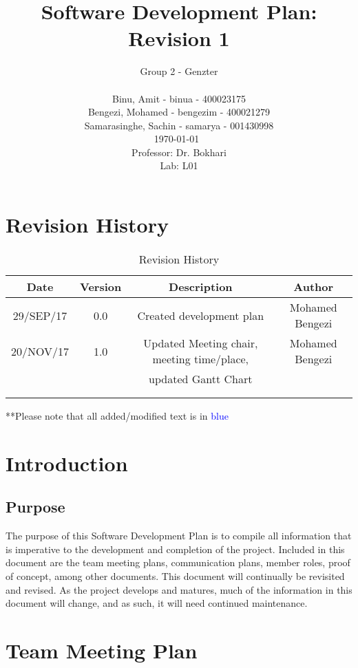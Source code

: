 \documentclass[12pt]{article}
\title{Software Development Plan: Revision 1}
\author{Group 2 - Genzter \\
		\\ Binu, Amit - binua - 400023175
		\\ Bengezi, Mohamed - bengezim - 400021279
		\\ Samarasinghe, Sachin - samarya - 001430998
		\\ \today\
		\\Professor: Dr. Bokhari
		\\ Lab: L01}
\begin{document}
\maketitle

\newpage

{\centering
  \tableofcontents\par
}

\newpage
\section{Revision History}
\begin{table}[h]
\begin{center}
\begin{tabular}{ | c | c | c | c | }
\hline
 Date & Version & Description & Author \\ 
\hline
 29/SEP/17 & 0.0 & Created development plan & Mohamed Bengezi \\  
\hline
 20/NOV/17 & 1.0  &Updated Meeting chair, meeting time/place,& Mohamed Bengezi \\
&&updated Gantt Chart & \\
\hline
 & & & \\
\hline 
 & & & \\ 
\hline 
\end{tabular}
\end{center}
\caption{Revision History}
\end{table}
**Please note that all added/modified text is in \textcolor{blue}{blue}
\newpage
\section{Introduction}
\subsection{Purpose}
\tab The purpose of this Software Development Plan is to compile all information that is imperative to the development and completion of the project. Included in this document are the team meeting plans, communication plans, member roles, proof of concept, among other documents. This document will continually be revisited and revised. As the project develops and matures, much of the information in this document will change, and as such, it will need continued maintenance.

\newpage

\section{Team Meeting Plan}
\end{document}
